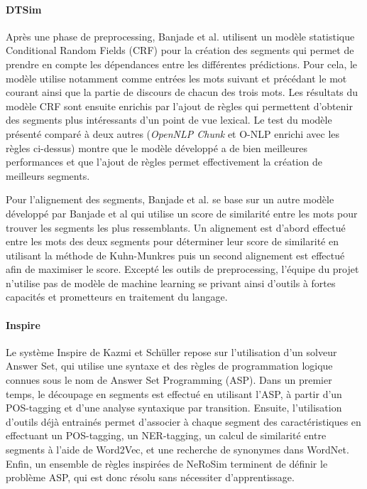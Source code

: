 \documentclass[a4paper, twoside, 11pt]{article}
\begin{document}
            \paragraph{DTSim}
        \hfill \break
        Après une phase de preprocessing, Banjade et al. \cite{banjade} utilisent un modèle statistique Conditional Random Fields (CRF) pour la création des segments qui permet de prendre en compte les dépendances entre les différentes prédictions. Pour cela, le modèle utilise notamment comme entrées les mots suivant et précédant le mot courant ainsi que la partie de discours de chacun des trois mots.
Les résultats du modèle CRF sont ensuite enrichis par l'ajout de règles qui permettent d'obtenir des segments plus intéressants d'un point de vue lexical. Le test du modèle présenté comparé à deux autres (\textit{OpenNLP Chunk} et O-NLP enrichi avec les règles ci-dessus) montre que le modèle développé a de bien meilleures performances et que l'ajout de règles permet effectivement la création de meilleurs segments.

 Pour l'alignement des segments, Banjade et al. se base sur un autre modèle développé par Banjade et al \cite{banjadeautre} qui utilise un score de similarité entre les mots pour trouver les segments les plus ressemblants. Un alignement est d'abord effectué entre les mots des deux segments pour déterminer leur score de similarité en utilisant la méthode de Kuhn-Munkres puis un second alignement est effectué afin de maximiser le score. Excepté les outils de preprocessing, l'équipe du projet n'utilise pas de modèle de machine learning se privant ainsi d'outils à fortes capacités et prometteurs en traitement du langage.

        \paragraph{Inspire}
        \hfill \break
Le système Inspire de Kazmi et Schüller \cite{kazmi} repose sur l'utilisation d'un solveur Answer Set, qui utilise une syntaxe et des règles de programmation logique connues sous le nom de Answer Set Programming (ASP). Dans un premier temps, le découpage en segments est effectué en utilisant l'ASP, à partir d'un POS-tagging et d'une analyse syntaxique par transition. Ensuite, l'utilisation d'outils déjà entrainés permet d'associer à chaque segment des caractéristiques en effectuant un POS-tagging, un NER-tagging, un calcul de similarité entre segments à l'aide de Word2Vec, et une recherche de synonymes dans WordNet. Enfin, un ensemble de règles inspirées de NeRoSim terminent de définir le problème ASP, qui est donc résolu sans nécessiter d'apprentissage.
\end{document}
